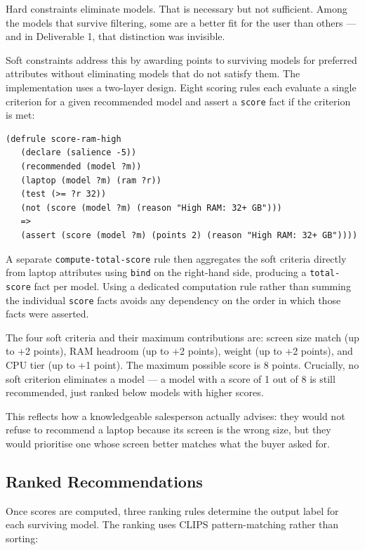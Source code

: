 \documentclass[12pt,a4paper]{article}
\begin{document}
Hard constraints eliminate models. That is necessary but not sufficient. Among the models that survive filtering, some are a better fit for the user than others --- and in Deliverable 1, that distinction was invisible.

Soft constraints address this by awarding points to surviving models for preferred attributes without eliminating models that do not satisfy them. The implementation uses a two-layer design. Eight scoring rules each evaluate a single criterion for a given recommended model and assert a \texttt{score} fact if the criterion is met:

\begin{lstlisting}[style=clips]
(defrule score-ram-high
   (declare (salience -5))
   (recommended (model ?m))
   (laptop (model ?m) (ram ?r))
   (test (>= ?r 32))
   (not (score (model ?m) (reason "High RAM: 32+ GB")))
   =>
   (assert (score (model ?m) (points 2) (reason "High RAM: 32+ GB"))))
\end{lstlisting}

A separate \texttt{compute-total-score} rule then aggregates the soft criteria directly from laptop attributes using \texttt{bind} on the right-hand side, producing a \texttt{total-score} fact per model. Using a dedicated computation rule rather than summing the individual \texttt{score} facts avoids any dependency on the order in which those facts were asserted.

The four soft criteria and their maximum contributions are: screen size match (up to +2 points), RAM headroom (up to +2 points), weight (up to +2 points), and CPU tier (up to +1 point). The maximum possible score is 8 points. Crucially, no soft criterion eliminates a model --- a model with a score of 1 out of 8 is still recommended, just ranked below models with higher scores.

This reflects how a knowledgeable salesperson actually advises: they would not refuse to recommend a laptop because its screen is the wrong size, but they would prioritise one whose screen better matches what the buyer asked for.

\subsection{Ranked Recommendations}

Once scores are computed, three ranking rules determine the output label for each surviving model. The ranking uses CLIPS pattern-matching rather than sorting:
\end{document}
